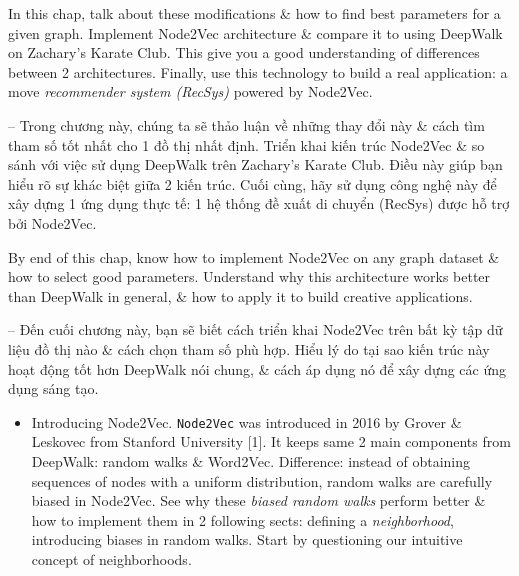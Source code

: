 \documentclass{article}
\begin{document}
\begin{itemize}
    In this chap, talk about these modifications \& how to find best parameters for a given graph. Implement Node2Vec architecture \& compare it to using DeepWalk on Zachary's Karate Club. This give you a good understanding of differences between 2 architectures. Finally, use this technology to build a real application: a move {\it recommender system (RecSys)} powered by Node2Vec.

    -- Trong chương này, chúng ta sẽ thảo luận về những thay đổi này \& cách tìm tham số tốt nhất cho 1 đồ thị nhất định. Triển khai kiến trúc Node2Vec \& so sánh với việc sử dụng DeepWalk trên Zachary's Karate Club. Điều này giúp bạn hiểu rõ sự khác biệt giữa 2 kiến trúc. Cuối cùng, hãy sử dụng công nghệ này để xây dựng 1 ứng dụng thực tế: 1 hệ thống đề xuất di chuyển (RecSys) được hỗ trợ bởi Node2Vec.

    By end of this chap, know how to implement Node2Vec on any graph dataset \& how to select good parameters. Understand why this architecture works better than DeepWalk in general, \& how to apply it to build creative applications.

    -- Đến cuối chương này, bạn sẽ biết cách triển khai Node2Vec trên bất kỳ tập dữ liệu đồ thị nào \& cách chọn tham số phù hợp. Hiểu lý do tại sao kiến trúc này hoạt động tốt hơn DeepWalk nói chung, \& cách áp dụng nó để xây dựng các ứng dụng sáng tạo.
    \begin{itemize}
        \item {\sf Introducing Node2Vec.} {\tt Node2Vec} was introduced in 2016 by {\sc Grover \& Leskovec} from Stanford University [1]. It keeps same 2 main components from DeepWalk: random walks \& Word2Vec. Difference: instead of obtaining sequences of nodes with a uniform distribution, random walks are carefully biased in Node2Vec. See why these {\it biased random walks} perform better \& how to implement them in 2 following sects: defining a {\it neighborhood}, introducing biases in random walks. Start by questioning our intuitive concept of neighborhoods.


\end{itemize}
\end{itemize}
\end{document}
